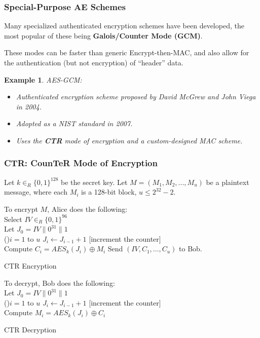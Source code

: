 \documentclass[12pt,titlepage]{article}
\newtheorem{protoexample}[prototheorem]{Example}
\newenvironment{example}
{\colorlet{shadecolor}{red!15}\begin{shaded}\begin{protoexample}\normalfont}{\end{protoexample}\end{shaded}}
\begin{document}
\subsubsection{Special-Purpose AE Schemes}

Many specialized authenticated encryption schemes have been developed, the most popular of these being \textbf{Galois/Counter Mode (GCM)}.

These modes can be faster than generic Encrypt-then-MAC, and also allow for the authentication (but not encryption) of ``header'' data.

\begin{example}
	AES-GCM: \begin{itemize}
		\item Authenticated encryption scheme proposed by David McGrew and John Viega in 2004.
		\item Adopted as a NIST standard in 2007.
		\item Uses the \textbf{CTR} mode of encryption and a custom-designed MAC scheme.
	\end{itemize}
\end{example}

\subsubsection{CTR: CounTeR Mode of Encryption}

Let $k \in_R \{0,1\}^{128}$ be the secret key. Let $M = (M_1, M_2 ,... , M_u)$ be a plaintext message, where each $M_i$ is a 128-bit block, $u \leq 2^{32} - 2$.

\begin{algorithm}
	To encrypt $M$, Alice does the following:\\
	Select $IV \in_R \{0, 1\}^{96}$\\
	Let $J_0 = IV \| 0^{31} \| 1$\\
	\For(){$i = 1$ to $u$}{
		$J_i \leftarrow J_{i-1} + 1$ [increment the counter]\\
		Compute $C_i = AES_k(J_i) \oplus M_i$
	}
	Send $(IV, C_1, ..., C_u)$ to Bob.
	\caption{CTR Encryption}
\end{algorithm}

\begin{algorithm}
	To decrypt, Bob does the following:\\
	Let $J_0 = IV \| 0^{31} \| 1$\\
	\For(){$i = 1$ to $u$}{
		$J_i \leftarrow J_{i-1} + 1$ [increment the counter]\\
		Compute $M_i = AES_k(J_i) \oplus C_i$
	}
	\caption{CTR Decryption}
\end{algorithm}
\end{document}
